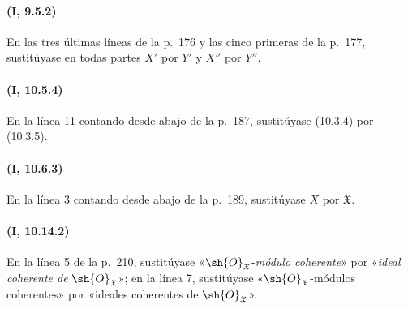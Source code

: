 \documentclass[oneside,10pt]{amsart}
\begin{document}
\paragraph{(I, 9.5.2)}
En las tres últimas líneas de la p.~176 y las cinco primeras de la
p.~177, sustitúyase en todas partes $X'$ por $Y'$ y $X''$ por $Y''$.

\paragraph{(I, 10.5.4)}
En la línea 11 contando desde abajo de la p.~187, sustitúyase (10.3.4)
por (10.3.5).

\paragraph{(I, 10.6.3)}
En la línea 3 contando desde abajo de la p.~189, sustitúyase $X$ por
$\mathfrak X$.

\paragraph{(I, 10.14.2)}
En la línea 5 de la p.~210, sustitúyase «$\sh{O}_{\mathfrak X}$-\emph{módulo
coherente}» por «\emph{ideal coherente de} $\sh{O}_{\mathfrak X}$»; en la
línea 7, sustitúyase «$\sh{O}_{\mathfrak X}$-módulos coherentes» por
«ideales coherentes de $\sh{O}_{\mathfrak X}$».
\end{document}
